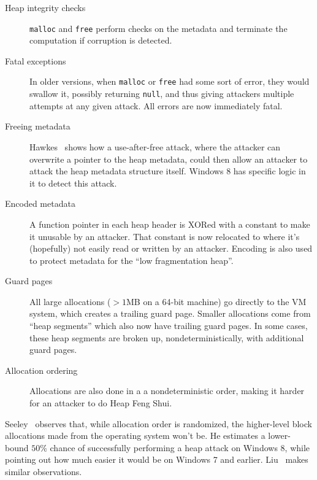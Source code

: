 \begin{description}
\item [Heap integrity checks] \texttt{malloc} and \texttt{free}
  perform checks on the metadata and terminate the computation if
  corruption is detected.
\item [Fatal exceptions] In older versions, when \texttt{malloc} or
  \texttt{free} had some sort of error, they would swallow it,
  possibly returning \texttt{null}, and thus giving attackers multiple
  attempts at any given attack. All errors are now immediately fatal.
\item [Freeing metadata] Hawkes~\cite{hawkes2008} shows how a
  use-after-free attack, where the attacker can overwrite a pointer to
  the heap metadata, could then allow an attacker to attack the heap
  metadata structure itself. Windows 8 has specific logic in it to
  detect this attack.
\item [Encoded metadata] A function pointer in each heap header is
  XORed with a constant to make it unusable by an attacker. That
  constant is now relocated to where it's (hopefully) not easily read
  or written by an attacker. Encoding is also used to protect metadata
  for the ``low fragmentation heap''.
\item [Guard pages] All large allocations ($>1$MB on a 64-bit machine)
  go directly to the VM system, which creates a trailing guard
  page. Smaller allocations come from ``heap segments'' which also now
  have trailing guard pages. In some cases, these heap segments are
  broken up, nondeterministically, with additional guard pages.
\item [Allocation ordering] Allocations are also done in a a
  nondeterministic order, making it harder for an attacker to do Heap
  Feng Shui.
\end{description}

Seeley~\cite{seeley2012} observes that, while allocation order is
randomized, the higher-level block allocations made from the operating
system won't be. He estimates a lower-bound $50\%$ chance of
successfully performing a heap attack on Windows 8, while pointing out
how much easier it would be on Windows 7 and
earlier. Liu~\cite{liu2013} makes similar observations.
